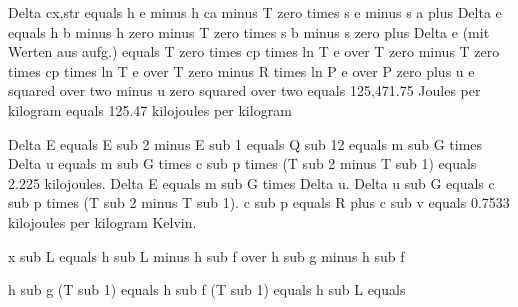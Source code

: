 Delta cx,str equals h e minus h ca minus T zero times s e minus s a plus Delta e equals h b minus h zero minus T zero times s b minus s zero plus Delta e (mit Werten aus aufg.) equals T zero times cp times ln T e over T zero minus T zero times cp times ln T e over T zero minus R times ln P e over P zero plus u e squared over two minus u zero squared over two equals 125,471.75 Joules per kilogram equals 125.47 kilojoules per kilogram

Delta E equals E sub 2 minus E sub 1 equals Q sub 12 equals m sub G times Delta u equals m sub G times c sub p times (T sub 2 minus T sub 1) equals 2.225 kilojoules.  
Delta E equals m sub G times Delta u.  
Delta u sub G equals c sub p times (T sub 2 minus T sub 1).  
c sub p equals R plus c sub v equals 0.7533 kilojoules per kilogram Kelvin.

x sub L equals h sub L minus h sub f over h sub g minus h sub f

h sub g (T sub 1) equals
h sub f (T sub 1) equals
h sub L equals